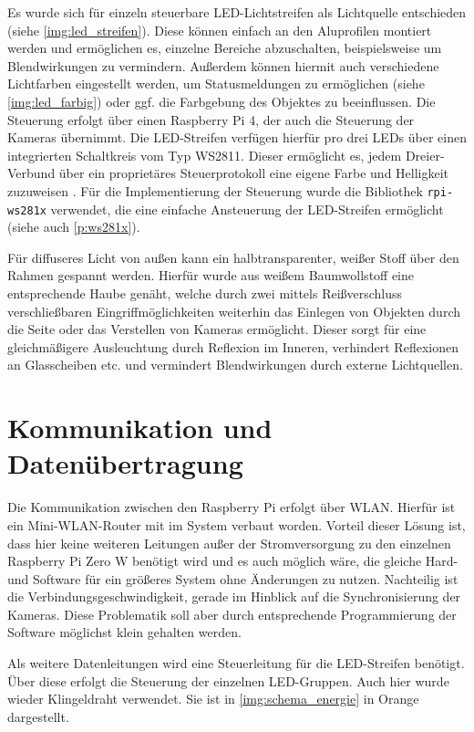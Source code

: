 \documentclass[./00PhotoBox.tex]{subfiles}
\begin{document}
Es wurde sich für einzeln steuerbare LED-Lichtstreifen als Lichtquelle entschieden (siehe \autoref{img:led_streifen}). Diese können einfach an den Aluprofilen montiert werden und ermöglichen es, einzelne Bereiche abzuschalten, beispielsweise um Blendwirkungen zu vermindern. Außerdem können hiermit auch verschiedene Lichtfarben eingestellt werden, um Statusmeldungen zu ermöglichen (siehe \autoref{img:led_farbig}) oder ggf. die Farbgebung des Objektes zu beeinflussen. Die Steuerung erfolgt über einen Raspberry Pi 4, der auch die Steuerung der Kameras übernimmt. Die LED-Streifen verfügen hierfür pro drei LEDs über einen integrierten Schaltkreis vom Typ WS2811. Dieser ermöglicht es, jedem Dreier-Verbund über ein proprietäres Steuerprotokoll eine eigene Farbe und Helligkeit zuzuweisen \citep{ws2811}. Für die Implementierung der Steuerung wurde die Bibliothek \texttt{rpi-ws281x} verwendet, die eine einfache Ansteuerung der LED-Streifen ermöglicht (siehe auch \autoref{p:ws281x}).

Für diffuseres Licht von außen kann ein halbtransparenter, weißer Stoff über den Rahmen gespannt werden. Hierfür wurde aus weißem Baumwollstoff eine entsprechende Haube genäht, welche durch zwei mittels Reißverschluss verschließbaren Eingriffmöglichkeiten weiterhin das Einlegen von Objekten durch die Seite oder das Verstellen von Kameras ermöglicht. Dieser sorgt für eine gleichmäßigere Ausleuchtung durch Reflexion im Inneren, verhindert Reflexionen an Glasscheiben etc. und vermindert Blendwirkungen durch externe Lichtquellen.


\section{Kommunikation und Datenübertragung}
Die Kommunikation zwischen den Raspberry Pi erfolgt über WLAN. Hierfür ist ein Mini-WLAN-Router mit im System verbaut worden. Vorteil dieser Lösung ist, dass hier keine weiteren Leitungen außer der Stromversorgung zu den einzelnen Raspberry Pi Zero W benötigt wird und es auch möglich wäre, die gleiche Hard- und Software für ein größeres System ohne Änderungen zu nutzen. Nachteilig ist die Verbindungsgeschwindigkeit, gerade im Hinblick auf die Synchronisierung der Kameras. Diese Problematik soll aber durch entsprechende Programmierung der Software möglichst klein gehalten werden. 

Als weitere Datenleitungen wird eine Steuerleitung für die LED-Streifen benötigt. Über diese erfolgt die Steuerung der einzelnen LED-Gruppen. Auch hier wurde wieder Klingeldraht verwendet. Sie ist in \autoref{img:schema_energie} in Orange dargestellt.
\end{document}
